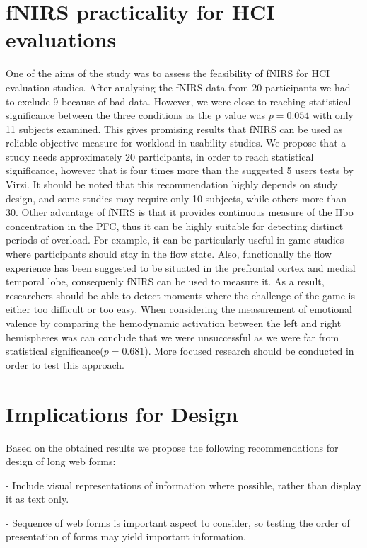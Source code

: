 \documentclass[a4paper]{report}
\begin{document}
	\section{fNIRS practicality for HCI evaluations}
		One of the aims of the study was to assess the feasibility of fNIRS for HCI evaluation studies. After analysing the fNIRS data from 20 participants we had to exclude 9 because of bad data. However, we were close to reaching statistical significance between the three conditions as the p value was $p=0.054$ with only 11 subjects examined. This gives promising results that fNIRS can be used as reliable objective measure for workload in usability studies. We propose that a study needs approximately 20 participants, in order to reach statistical significance, however that is four times more than the suggested 5 users tests by Virzi\cite{virzi1992refining}. It should be noted that this recommendation highly depends on study design, and some studies may require only 10 subjects, while others more than 30.
		Other advantage of fNIRS is that it provides continuous measure of the Hbo concentration in the PFC, thus it can be highly suitable for detecting distinct periods of overload. For example, it can be particularly useful in game studies where participants should stay in the flow\cite{nakamura2002concept} state. Also, functionally the flow experience has been suggested to be situated in the prefrontal cortex and medial temporal lobe\cite{dietrich2004neurocognitive}, consequenly fNIRS can be used to measure it. As a result, researchers should be able to detect moments where the challenge of the game is either too difficult or too easy.
		When considering the measurement of emotional valence by comparing the hemodynamic activation between the left and right hemispheres was can conclude that we were unsuccessful as we were far from statistical significance($p=0.681$). More focused research should be conducted in order to test this approach. 
	\section{Implications for Design}
		Based on the obtained results we propose the following recommendations for design of long web forms:
		
		- Include visual representations of information where possible, rather than display it as text only.
		
		- Sequence of web forms is important aspect to consider, so testing the order of presentation of forms may yield important information.
		
\end{document}
